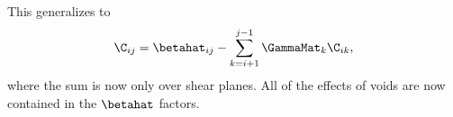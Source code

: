 This generalizes to 
\begin{equation}
\C_{i j} = \betahat_{i j} - \sum\limits_{k = i +1}^{j - 1} \GammaMat_k \C_{i k},
\end{equation}
where the sum is now only over shear planes. All of the effects of voids are now contained in the $\betahat$ factors. 
  